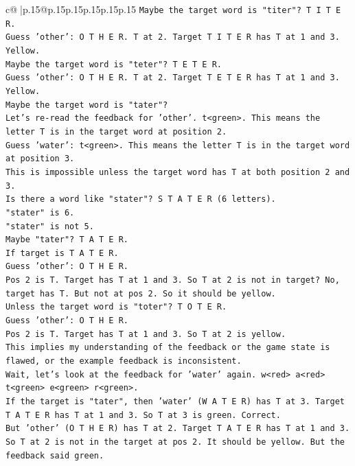 \documentclass{article}
\begin{document}
{\begin{supertabular}{c@{$\;$}|p{.15\linewidth}@{}p{.15\linewidth}p{.15\linewidth}p{.15\linewidth}p{.15\linewidth}p{.15\linewidth}}
{{{\texttt{Maybe the target word is "titer"? T I T E R.} \\
\texttt{Guess 'other': O T H E R. T at 2. Target T I T E R has T at 1 and 3. Yellow.} \\
\texttt{Maybe the target word is "teter"? T E T E R.} \\
\texttt{Guess 'other': O T H E R. T at 2. Target T E T E R has T at 1 and 3. Yellow.} \\
\texttt{Maybe the target word is "tater"?} \\
\texttt{Let's re{-}read the feedback for 'other'. t<green>. This means the letter T is in the target word at position 2.} \\
\texttt{Guess 'water': t<green>. This means the letter T is in the target word at position 3.} \\
\texttt{This is impossible unless the target word has T at both position 2 and 3.} \\
\texttt{Is there a word like "stater"? S T A T E R (6 letters).} \\
\texttt{"stater" is 6.} \\
\texttt{"stater" is not 5.} \\
\texttt{Maybe "tater"? T A T E R.} \\
\texttt{If target is T A T E R.} \\
\texttt{Guess 'other': O T H E R.} \\
\texttt{Pos 2 is T. Target has T at 1 and 3. So T at 2 is not in target? No, target has T. But not at pos 2. So it should be yellow.} \\
\texttt{Unless the target word is "toter"? T O T E R.} \\
\texttt{Guess 'other': O T H E R.} \\
\texttt{Pos 2 is T. Target has T at 1 and 3. So T at 2 is yellow.} \\
\texttt{This implies my understanding of the feedback or the game state is flawed, or the example feedback is inconsistent.} \\
\texttt{Wait, let's look at the feedback for 'water' again. w<red> a<red> t<green> e<green> r<green>.} \\
\texttt{If the target is "tater", then 'water' (W A T E R) has T at 3. Target T A T E R has T at 1 and 3. So T at 3 is green. Correct.} \\
\texttt{But 'other' (O T H E R) has T at 2. Target T A T E R has T at 1 and 3. So T at 2 is not in the target at pos 2. It should be yellow. But the feedback said green.} \\
}}}
\end{supertabular}}
\end{document}
